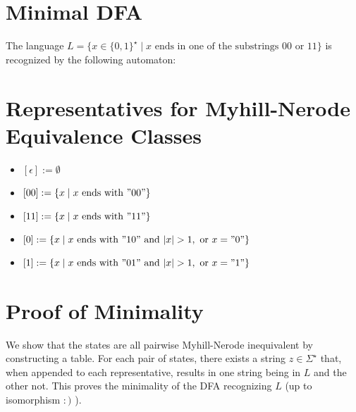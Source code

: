 



\section{Minimal DFA}
The language \( L = \{ x \in \{0, 1\}^\star \mid x \text{ ends in one of the substrings } 00 \text{ or } 11 \} \) is recognized by the following automaton:

\begin{center}
\end{center}

\section{Representatives for Myhill-Nerode Equivalence Classes}

\begin{itemize}
    \item \( [\epsilon] := \emptyset \)
    \item \( [00] := \{ x \mid x \text{ ends with } "00" \} \)
    \item \( [11] := \{ x \mid x \text{ ends with } "11" \} \)
    \item \( [0] := \{ x \mid x \text{ ends with } "10" \text{ and } |x| > 1, \text{ or } x = "0" \} \)
    \item \( [1] := \{ x \mid x \text{ ends with } "01" \text{ and } |x| > 1, \text{ or } x = "1" \} \)
\end{itemize}

\section{Proof of Minimality}
We show that the states are all pairwise Myhill-Nerode inequivalent by constructing a table. For each pair of states, there exists a string \( z \in \Sigma^\star \) that, when appended to each representative, results in one string being in \( L \) and the other not. This proves the minimality of the DFA recognizing \( L \) (up to isomorphism $:)$ ).

